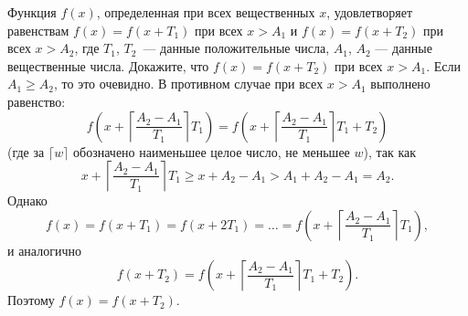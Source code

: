 \problem
Функция $f(x)$, определенная при всех вещественных $x$, удовлетворяет
равенствам
$f(x) = f(x + T_1)$ при всех $x > A_1$ и
$f(x) = f(x + T_2)$ при всех $x > A_2$,
где $T_1$, $T_2$~--- данные положительные числа,
$A_1$, $A_2$ --- данные вещественные числа.
Докажите, что $f(x) = f(x + T_2)$ при всех $x > A_1$.
\solution
Если $A_1 \geq A_2$, то это очевидно.
В противном случае при всех $x > A_1$ выполнено равенство:
\[
    f\left(
        x
        +
        \left\lceil
            \frac{A_2 - A_1}{T_1}
        \right\rceil
        T_1
    \right)
=
    f\left(
        x
        +
        \left\lceil
            \frac{A_2 - A_1}{T_1}
        \right\rceil
        T_1
        +
        T_2
    \right)
\]
(где за $\lceil w \rceil$ обозначено наименьшее целое число, не меньшее $w$),
так как
\[
    x
    +
    \left\lceil
        \frac{A_2 - A_1}{T_1}
    \right\rceil
    T_1
\geq
    x + A_2 - A_1
>
    A_1 + A_2 - A_1
=
    A_2
.\]
Однако
\[
    f(x) = f(x + T_1) = f(x + 2 T_1)
= \ldots =
    f\left(
        x
        +
        \left\lceil
            \frac{A_2 - A_1}{T_1}
        \right\rceil T_1
    \right)
,\]
и аналогично
\[
	f(x + T_2)
=
     f\left(
        x
        +
        \left\lceil
        \frac{A_2 - A_1}{T_1}
        \right\rceil
        T_1
        +
        T_2
     \right)
.\]
Поэтому $f(x) = f(x + T_2)$.
\endproblem
